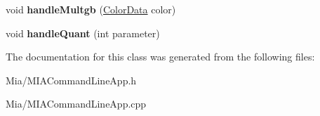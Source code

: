 \begin{DoxyCompactItemize}
\item 
\hypertarget{classMIACommandLineApp_ab3837792e96c27534b0290e7b7bdd5cc}{void {\bfseries handle\-Multgb} (\hyperlink{classColorData}{Color\-Data} color)}\label{classMIACommandLineApp_ab3837792e96c27534b0290e7b7bdd5cc}

\item 
\hypertarget{classMIACommandLineApp_a7dd611671ab000d8c7975d4b9b2f125b}{void {\bfseries handle\-Quant} (int parameter)}\label{classMIACommandLineApp_a7dd611671ab000d8c7975d4b9b2f125b}

\end{DoxyCompactItemize}


The documentation for this class was generated from the following files\-:\begin{DoxyCompactItemize}
\item 
Mia/M\-I\-A\-Command\-Line\-App.\-h\item 
Mia/M\-I\-A\-Command\-Line\-App.\-cpp\end{DoxyCompactItemize}
